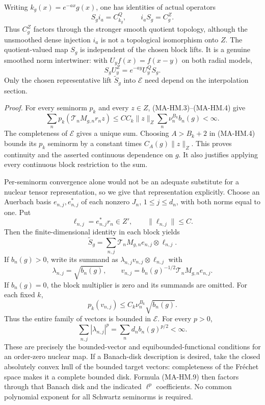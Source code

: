 Writing $k_g(x)=e^{-ax}g(x)$, one has identities of actual operators
\[
             S_gi_a=C_{k_g}^{Q},\qquad
             i_aS_g=C_g^{Z}.
 \tag{MA-HM.6}
\]
Thus $C_g^Z$ factors through the stronger smooth quotient topology,
although the unsmoothed dense injection $i_a$ is not a topological
isomorphism onto $Z$.  The quotient-valued map $S_g$ is independent
of the chosen block lifts.  It is a genuine smoothed norm
intertwiner: with $U_yf(x)=f(x-y)$ on both radial models,
\[
             S_gU_y^Z=e^{-ay}U_y^QS_g .
 \tag{MA-HM.6a}
\]
Only the chosen representative lift $\widetilde S_g$ into
$\mathcal E$ need depend on the interpolation section.

\emph{Proof.}
For every seminorm $p_k$ and every $z\in Z$, (MA-HM.3)--(MA-HM.4)
give
\[
 \sum_n p_k(\mathcal T_nM_{g,n}r_nz)
      \le CC_k\|z\|_Z\sum_n\nu_n^{B_k}b_n(g)<\infty.
 \tag{MA-HM.7}
\]
The completeness of $\mathcal E$ gives a unique sum.  Choosing
$A>B_k+2$ in (MA-HM.4) bounds its $p_k$ seminorm by
a constant times $C_A(g)\|z\|_Z$.  This proves continuity and
the asserted continuous dependence on $g$.  It also justifies
applying every continuous block restriction to the sum.

Per-seminorm convergence alone would not be an adequate
substitute for a nuclear tensor representation, so we give that
representation explicitly.  Choose an Auerbach basis
$e_{n,j},e_{n,j}^*$ of each nonzero $J_n$,
$1\le j\le d_n$, with both norms equal to one.  Put
\[
     \ell_{n,j}=e_{n,j}^*r_n\in Z',\qquad
           \|\ell_{n,j}\|\le C.
 \tag{MA-HM.8}
\]
Then the finite-dimensional identity in each block yields
\[
       \widetilde S_g
           =\sum_{n,j}\mathcal T_nM_{g,n}e_{n,j}
                                      \otimes\ell_{n,j}.
 \tag{MA-HM.9}
\]
If $b_n(g)>0$, write its summand as
$\lambda_{n,j}v_{n,j}\otimes\ell_{n,j}$ with
\[
   \lambda_{n,j}=\sqrt{b_n(g)},\qquad
   v_{n,j}=b_n(g)^{-1/2}\mathcal T_nM_{g,n}e_{n,j}.
 \tag{MA-HM.10}
\]
If $b_n(g)=0$, the block multiplier is zero and its summands
are omitted.  For each fixed $k$,
\[
       p_k(v_{n,j})\le C_k\nu_n^{B_k}\sqrt{b_n(g)}.
 \tag{MA-HM.11}
\]
Thus the entire family of vectors is bounded in $\mathcal E$.
For every $p>0$,
\[
       \sum_{n,j}|\lambda_{n,j}|^p
          =\sum_nd_n b_n(g)^{p/2}<\infty.
 \tag{MA-HM.12}
\]
These are precisely the bounded-vector and equibounded-functional
conditions for an order-zero nuclear map.  If a Banach-disk
description is desired, take the closed absolutely convex hull
of the bounded target vectors: completeness of the Fr\'echet
space makes it a complete bounded disk.  Formula (MA-HM.9)
then factors through that Banach disk and the indicated
$\ell^p$ coefficients.  No common polynomial exponent for
all Schwartz seminorms is required.

